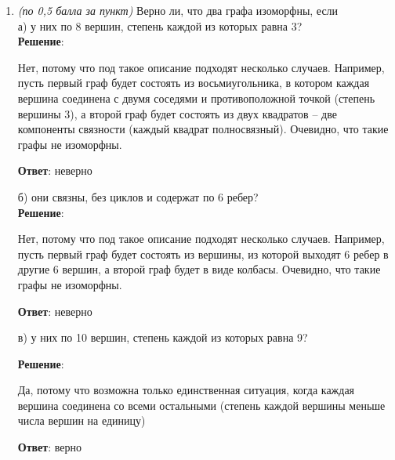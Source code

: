 \documentclass{article}
\begin{document}
\begin{enumerate}
    \item \textit{(по 0,5 балла за пункт)} Верно ли, что два графа изоморфны, если\\
    а) у них по 8 вершин, степень каждой из которых равна 3?\\
    \textbf{Решение}:

    Нет, потому что под такое описание подходят несколько случаев. Например, пусть первый граф будет состоять из восьмиугольника, в котором каждая вершина соединена с двумя соседями и противоположной точкой (степень вершины 3), а второй граф будет состоять из двух квадратов -- две компоненты связности (каждый квадрат полносвязный). Очевидно, что такие графы не изоморфны.

    \textbf{Ответ}:
    неверно

    б) они связны, без циклов и содержат по 6 ребер?\\
    \textbf{Решение}:

    Нет, потому что под такое описание подходят несколько случаев. Например, пусть первый граф будет состоять из вершины, из которой выходят 6 ребер в другие 6 вершин, а второй граф будет в виде колбасы. Очевидно, что такие графы не изоморфны.

    \textbf{Ответ}:
    неверно

    в) у них по 10 вершин, степень каждой из которых равна 9?

    \textbf{Решение}:

    Да, потому что возможна только единственная ситуация, когда каждая вершина соединена со всеми остальными (степень каждой вершины меньше числа вершин на единицу)

    \textbf{Ответ}:
    верно
    
    
\end{enumerate}
\end{document}
